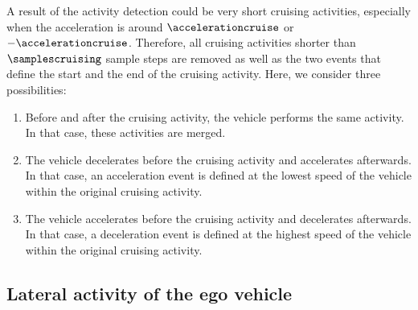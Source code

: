 A result of the activity detection could be very short cruising activities, especially when the acceleration is around $\accelerationcruise$ or $-\accelerationcruise$. 
Therefore, all cruising activities shorter than $\samplescruising$ sample steps are removed as well as the two events that define the start and the end of the cruising activity. 
Here, we consider three possibilities:
\begin{enumerate}
	\item Before and after the cruising activity, the vehicle performs the same activity. In that case, these activities are merged.
	\item The vehicle decelerates before the cruising activity and accelerates afterwards. In that case, an acceleration event is defined at the lowest speed of the vehicle within the original cruising activity.
	\item The vehicle accelerates before the cruising activity and decelerates afterwards. In that case, a deceleration event is defined at the highest speed of the vehicle within the original cruising activity.
\end{enumerate}



\subsection{Lateral activity of the ego vehicle}
\label{sec:lateral ego}

